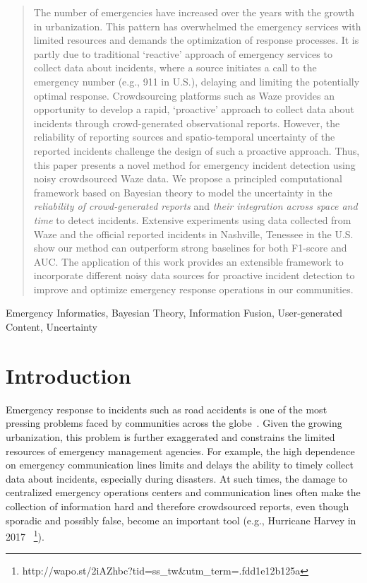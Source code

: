 \documentclass[conference]{IEEEtran}
\begin{document}
\begin{abstract}

The number of emergencies have increased over the years with the growth in urbanization. 
This pattern has overwhelmed the emergency services with limited resources and demands the optimization of response processes. It is partly due to traditional `reactive' approach of emergency services to collect data about incidents, where a source initiates a call to the emergency number (e.g., 911 in U.S.), delaying and limiting the potentially optimal response.  
Crowdsourcing platforms such as Waze provides an opportunity to develop a rapid, `proactive' approach to collect data about incidents through crowd-generated observational reports. 
However, the reliability of reporting sources and spatio-temporal uncertainty of the reported incidents challenge the design of such a proactive approach.  
Thus, this paper presents a novel method for emergency incident detection using noisy crowdsourced Waze data.
We propose a principled computational framework based on Bayesian theory to model the uncertainty in the \textit{reliability of crowd-generated reports} and \textit{their integration across space and time} to detect incidents.  
Extensive experiments using data collected from Waze and the official reported incidents in Nashville, Tenessee in the U.S. show our method can outperform strong baselines for both F1-score and AUC.    
The application of this work provides an extensible framework to incorporate different noisy data sources for proactive incident detection to improve and optimize emergency response operations in our communities.     

\end{abstract}

\begin{IEEEkeywords}
Emergency Informatics, Bayesian Theory, Information Fusion, User-generated Content, Uncertainty
\end{IEEEkeywords}

\section{Introduction}
\label{sec:intro}

Emergency response to incidents such as road accidents is one of the most pressing problems faced by communities across the globe~\cite{mukhopadhyay2020review}. Given the growing urbanization, this problem is further exaggerated and constrains the limited resources of emergency management agencies. For example, the high dependence on emergency communication lines limits and delays the ability to timely collect data about incidents, especially during disasters. At such times, 
the damage to centralized emergency operations centers and communication lines often make the collection of information hard and therefore crowdsourced reports, even though sporadic and possibly false, become an important tool (e.g., Hurricane Harvey in 2017
~\footnote{http://wapo.st/2iAZhbc?tid=ss\_tw\&utm\_term=.fdd1e12b125a}). 
\end{document}
